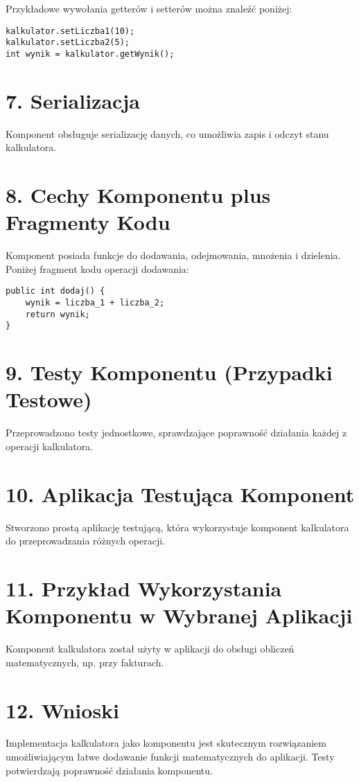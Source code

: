 \documentclass{article}
\begin{document}
Przykładowe wywołania getterów i setterów można znaleźć poniżej:

\begin{verbatim}
kalkulator.setLiczba1(10);
kalkulator.setLiczba2(5);
int wynik = kalkulator.getWynik();
\end{verbatim}

\section*{7. Serializacja}

Komponent obsługuje serializację danych, co umożliwia zapis i odczyt stanu kalkulatora.

\section*{8. Cechy Komponentu plus Fragmenty Kodu}

Komponent posiada funkcje do dodawania, odejmowania, mnożenia i dzielenia. Poniżej fragment kodu operacji dodawania:

\begin{verbatim}
public int dodaj() {
    wynik = liczba_1 + liczba_2;
    return wynik;
}
\end{verbatim}

\section*{9. Testy Komponentu (Przypadki Testowe)}

Przeprowadzono testy jednostkowe, sprawdzające poprawność działania każdej z operacji kalkulatora.

\section*{10. Aplikacja Testująca Komponent}

Stworzono prostą aplikację testującą, która wykorzystuje komponent kalkulatora do przeprowadzania różnych operacji.

\section*{11. Przykład Wykorzystania Komponentu w Wybranej Aplikacji}

Komponent kalkulatora został użyty w aplikacji do obsługi obliczeń matematycznych, np. przy fakturach.

\section*{12. Wnioski}

Implementacja kalkulatora jako komponentu jest skutecznym rozwiązaniem umożliwiającym łatwe dodawanie funkcji matematycznych do aplikacji. Testy potwierdzają poprawność działania komponentu.
\end{document}
